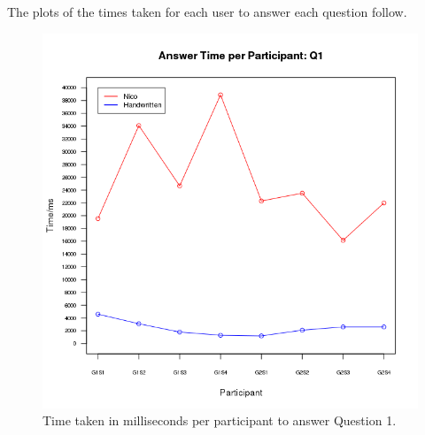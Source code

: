 \documentclass[12pt,twoside,notitlepage,xetex]{report}
\begin{document}
The plots of the times taken for each user to answer each question follow.

\begin{center}
\begin{figure}[H]
\begin{center}
\includegraphics[height=\textheight/2-2cm]{figs/graphs/q1.png}
\end{center}
\caption{Time taken in milliseconds per participant to answer Question 1.}
\end{figure}
\end{center}
\end{document}
